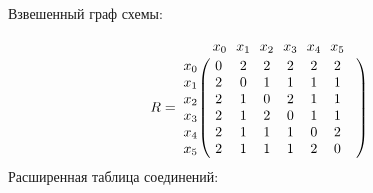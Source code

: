 \documentclass{article}
\begin{document}
Взвешенный граф схемы:
\begin{figure}[h!]
\end{figure}
$$
R =
\bordermatrix{ & x_{0} \!&\! x_{1} \!&\! x_{2} \!&\! x_{3} \!&\! x_{4} \!&\! x_{5} \!&\! \cr 
x_{0} \!&\! 0 \!&\! 2 \!&\! 2 \!&\! 2 \!&\! 2 \!&\! 2 \!&\! \cr
x_{1} \!&\! 2 \!&\! 0 \!&\! 1 \!&\! 1 \!&\! 1 \!&\! 1 \!&\! \cr
x_{2} \!&\! 2 \!&\! 1 \!&\! 0 \!&\! 2 \!&\! 1 \!&\! 1 \!&\! \cr
x_{3} \!&\! 2 \!&\! 1 \!&\! 2 \!&\! 0 \!&\! 1 \!&\! 1 \!&\! \cr
x_{4} \!&\! 2 \!&\! 1 \!&\! 1 \!&\! 1 \!&\! 0 \!&\! 2 \!&\! \cr
x_{5} \!&\! 2 \!&\! 1 \!&\! 1 \!&\! 1 \!&\! 2 \!&\! 0 \!&\! \cr
}$$
Расширенная таблица соединений:
\end{document}
